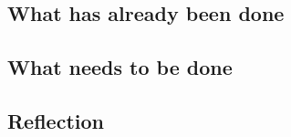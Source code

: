 \subsection{What has already been done}


\subsection{What needs to be done}

\subsection{Reflection}




